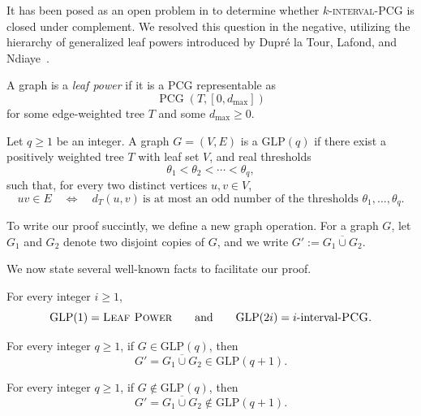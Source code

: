 \documentclass[a4paper,UKenglish,cleveref,autoref,thm-restate]{socg-lipics-v2021}
\begin{document}
It has been posed as an open problem in \cite{Calamoneri2021OnGOI,survey} to determine whether $k$\textsc{-interval-\textsc{PCG}} is closed under complement. We resolved this question in the negative, utilizing the hierarchy of generalized leaf powers introduced by Dupr\'e la Tour,
Lafond, and Ndiaye~\cite{la2026recognizing}.

\begin{definition}
A graph is a \emph{leaf power} if it is a \textsc{PCG} representable as
\[
\operatorname{PCG}(T,[0,d_{\max}])
\]
for some edge-weighted tree \(T\) and some \(d_{\max}\ge 0\).
\end{definition}

\begin{definition}
Let \(q \ge 1\) be an integer. A graph \(G=(V,E)\) is a \(\mathrm{GLP}(q)\) if there exist
a positively weighted tree \(T\) with leaf set \(V\), and real thresholds
\[
\theta_1 < \theta_2 < \cdots < \theta_q,
\]
such that, for every two distinct vertices \(u,v \in V\),
\[
uv \in E
\quad\Longleftrightarrow\quad
d_T(u,v)\ \text{is at most an odd number of the thresholds } \theta_1,\dots,\theta_q.
\]
\end{definition}

To write our proof succintly, we define a new graph operation. For a graph \(G\), let \(G_1\) and \(G_2\) denote two disjoint copies of \(G\), and we write
\(
G' := \overline{G_1 \cup G_2}.
\)

We now state several well-known facts to facilitate our proof.

\begin{proposition}\label{fact:glp-even}
\cite{la2026recognizing}
For every integer \(i \ge 1\),
\[
\mathrm{GLP}(1)=\textsc{Leaf Power}
\qquad\text{and}\qquad
\mathrm{GLP}(2i)= i\text{-interval-}\textsc{PCG}.
\]
\end{proposition}


\begin{proposition}\label{fact:glp-up}
\cite{la2026recognizing}
For every integer \(q \ge 1\), if \(G \in \mathrm{GLP}(q)\), then
\[
G'=\overline{G_1 \cup G_2}\in \mathrm{GLP}(q+1).
\]
\end{proposition}

\begin{proposition}\label{fact:glp-down}
\cite{la2026recognizing}
For every integer \(q \ge 1\), if \(G \notin \mathrm{GLP}(q)\), then
\[
G'=\overline{G_1 \cup G_2}\notin \mathrm{GLP}(q+1).
\]
\end{proposition}
\end{document}
